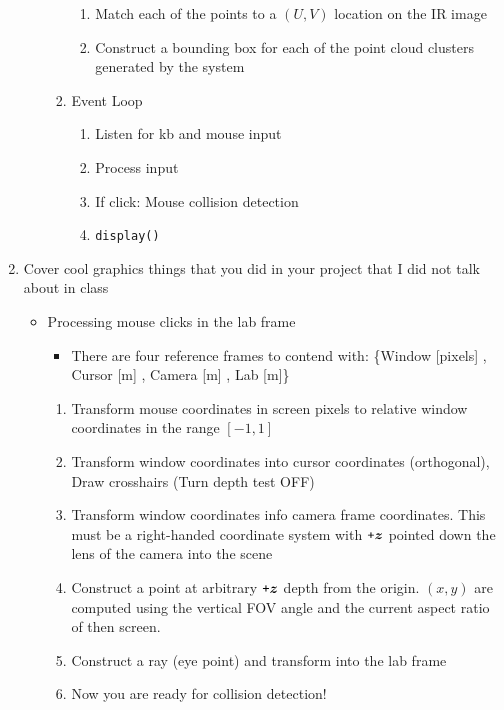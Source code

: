 \documentclass{hw_grad}
\begin{document}
\begin{enumerate}
\begin{enumerate}
\begin{enumerate}
\begin{enumerate}
					\item Match each of the points to a $\left( U,V \right)$ location on the IR image
					\item Construct a bounding box for each of the point cloud clusters generated by the system
				\end{enumerate}
				\item Event Loop
				\begin{enumerate}
					\item Listen for kb and mouse input
					\item Process input
					\item If click: Mouse collision detection
					\item {\tt display()}
				\end{enumerate}
			\end{enumerate}
		\end{enumerate}
		
		\item Cover cool graphics things that you did in your project that I did not talk about in class
		
		\begin{itemize}
			
			\item Processing mouse clicks in the lab frame
			\begin{itemize}
				\item There are four reference frames to contend with: \{Window [pixels] , Cursor [m] , Camera [m] , Lab [m]\}
			\end{itemize}
			\begin{enumerate}
				\item Transform mouse coordinates in screen pixels to relative window coordinates in the range $\left[ -1 , 1 \right]$
				\item Transform window coordinates into cursor coordinates (orthogonal), Draw crosshairs (Turn depth test OFF)
				\item Transform window coordinates info camera frame coordinates.  This must be a right-handed coordinate system with $ \texttt{+} \hbox{\boldmath$z$} $ pointed down the lens of the camera into the scene
				\item Construct a point at arbitrary $ \texttt{+} \hbox{\boldmath$z$} $ depth from the origin. $\left(x,y\right)$ are computed using the vertical FOV angle and the current aspect ratio of then screen.
				\item Construct a ray (eye \rarw point) and transform into the lab frame
				\item Now you are ready for collision detection!
			\end{enumerate}
			

\end{itemize}
\end{enumerate}
\end{document}
